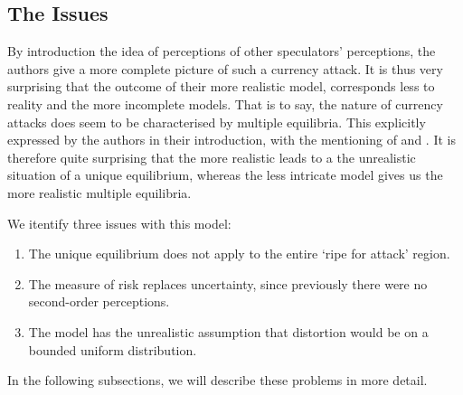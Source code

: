 \begin{refsection}
\section{The Issues}
\label{unc:issues}
By introduction the idea of perceptions of other speculators' perceptions,
the authors give a more complete picture of such a currency attack.
It is thus very surprising that the outcome of their more realistic model,
corresponds less to reality and the more incomplete models.
That is to say, the nature of currency attacks does seem to be characterised by multiple equilibria.
This explicitly expressed by the authors in their introduction, with the mentioning of \textcite{eichengreen1993unstable} and \textcite{dornbusch1994mexico}.
It is therefore quite surprising that the more realistic leads to a the unrealistic situation of a unique equilibrium,
whereas the less intricate model gives us the more realistic multiple equilibria.

We itentify three issues with this model:
\begin{enumerate}
	\item The unique equilibrium does not apply to the entire `ripe for attack' region.
	\item The measure of risk replaces uncertainty, since previously there were no second-order perceptions.
	\item The model has the unrealistic assumption that distortion would be on a bounded uniform distribution.
\end{enumerate}
In the following subsections, we will describe these problems in more detail.


\end{refsection}

